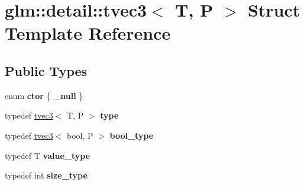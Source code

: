 \hypertarget{structglm_1_1detail_1_1tvec3}{}\section{glm\+:\+:detail\+:\+:tvec3$<$ T, P $>$ Struct Template Reference}
\label{structglm_1_1detail_1_1tvec3}
\subsection*{Public Types}
\begin{DoxyCompactItemize}
\item 
enum {\bfseries ctor} \{ {\bfseries \+\_\+null}
 \}\hypertarget{structglm_1_1detail_1_1tvec3_a370bdb3bb793461504b1387daec78083}{}\label{structglm_1_1detail_1_1tvec3_a370bdb3bb793461504b1387daec78083}

\item 
typedef \hyperlink{structglm_1_1detail_1_1tvec3}{tvec3}$<$ T, P $>$ {\bfseries type}\hypertarget{structglm_1_1detail_1_1tvec3_acd2bae8742f34efdb3605e8399b5e7c1}{}\label{structglm_1_1detail_1_1tvec3_acd2bae8742f34efdb3605e8399b5e7c1}

\item 
typedef \hyperlink{structglm_1_1detail_1_1tvec3}{tvec3}$<$ bool, P $>$ {\bfseries bool\+\_\+type}\hypertarget{structglm_1_1detail_1_1tvec3_aabd96f8052cc3964f695e9307a4ad403}{}\label{structglm_1_1detail_1_1tvec3_aabd96f8052cc3964f695e9307a4ad403}

\item 
typedef T {\bfseries value\+\_\+type}\hypertarget{structglm_1_1detail_1_1tvec3_aebabd0d52c43d26ee4d66ba4606eb03c}{}\label{structglm_1_1detail_1_1tvec3_aebabd0d52c43d26ee4d66ba4606eb03c}

\item 
typedef int {\bfseries size\+\_\+type}\hypertarget{structglm_1_1detail_1_1tvec3_a9c82390594a6adc72db5533c2f1013a4}{}\label{structglm_1_1detail_1_1tvec3_a9c82390594a6adc72db5533c2f1013a4}

\end{DoxyCompactItemize}
